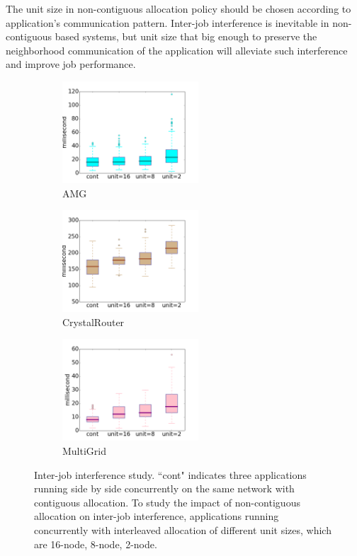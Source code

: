 \documentclass[conference]{IEEEtran}
\begin{document}
The unit size in non-contiguous allocation policy should be chosen according to application's communication pattern. Inter-job interference is inevitable in non-contiguous based systems, but unit size that big enough to preserve the neighborhood communication of the application will alleviate such interference and improve job performance. 



\begin{figure}[t!]
    \centering
    \begin{subfigure}[t]{0.32\textwidth}
        \centering
        \includegraphics[height=1.5in]{figs/inter-job/amg}
        \caption{AMG}
        \label{fig:interjob-amg-box}
    \end{subfigure}%
    \hspace{1em}%
    \begin{subfigure}[t]{0.32\textwidth}
        \centering
        \includegraphics[height=1.5in]{figs/inter-job/cr}
        \caption{CrystalRouter}
        \label{fig:interjob-cr-box}
    \end{subfigure}%
    \begin{subfigure}[t]{0.32\textwidth}
        \centering
        \includegraphics[height=1.5in]{figs/inter-job/mg}
        \caption{MultiGrid}
        \label{fig:interjob-mg-box}
    \end{subfigure}%
   \caption{Inter-job interference study. ``cont" indicates three applications running side by side concurrently on the same network with contiguous allocation. To study the impact of non-contiguous allocation on inter-job interference, applications running concurrently with interleaved allocation of different unit sizes, which are 16-node, 8-node, 2-node. }
   \label{fig: 3apps interjob study}
\end{figure}
\end{document}
